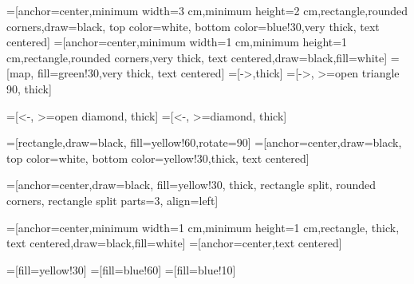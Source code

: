 =[anchor=center,minimum width=3 cm,minimum height=2 cm,rectangle,rounded corners,draw=black, top color=white, bottom color=blue!30,very thick, text centered]
=[anchor=center,minimum width=1 cm,minimum height=1 cm,rectangle,rounded corners,very thick, text centered,draw=black,fill=white]
=[map, fill=green!30,very thick, text centered]
=[->,thick]
=[->, >=open triangle 90, thick]

=[<-, >=open diamond, thick]
=[<-, >=diamond, thick]

=[rectangle,draw=black, fill=yellow!60,rotate=90]
=[anchor=center,draw=black, top color=white, bottom color=yellow!30,thick, text centered]

=[anchor=center,draw=black, fill=yellow!30, thick, rectangle split, rounded corners, rectangle split parts=3, align=left]

=[anchor=center,minimum width=1 cm,minimum height=1 cm,rectangle, thick, text centered,draw=black,fill=white]
=[anchor=center,text centered]

=[fill=yellow!30]
=[fill=blue!60]
=[fill=blue!10]

